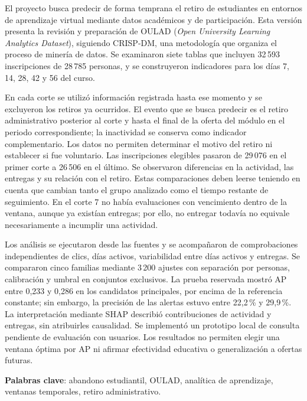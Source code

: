 El proyecto busca predecir de forma temprana el retiro de estudiantes en entornos de aprendizaje virtual mediante datos académicos y de participación. Esta versión presenta la revisión y preparación de OULAD (\textit{Open University Learning Analytics Dataset}), siguiendo CRISP-DM, una metodología que organiza el proceso de minería de datos. Se examinaron siete tablas que incluyen 32\,593 inscripciones de 28\,785 personas, y se construyeron indicadores para los días 7, 14, 28, 42 y 56 del curso.

En cada corte se utilizó información registrada hasta ese momento y se excluyeron los retiros ya ocurridos. El evento que se busca predecir es el retiro administrativo posterior al corte y hasta el final de la oferta del módulo en el periodo correspondiente; la inactividad se conserva como indicador complementario. Los datos no permiten determinar el motivo del retiro ni establecer si fue voluntario. Las inscripciones elegibles pasaron de 29\,076 en el primer corte a 26\,506 en el último. Se observaron diferencias en la actividad, las entregas y su relación con el retiro. Estas comparaciones deben leerse teniendo en cuenta que cambian tanto el grupo analizado como el tiempo restante de seguimiento. En el corte 7 no había evaluaciones con vencimiento dentro de la ventana, aunque ya existían entregas; por ello, no entregar todavía no equivale necesariamente a incumplir una actividad.

Los análisis se ejecutaron desde las fuentes y se acompañaron de comprobaciones independientes de clics, días activos, variabilidad entre días activos y entregas. Se compararon cinco familias mediante 3\,200 ajustes con separación por personas, calibración y umbral en conjuntos exclusivos. La prueba reservada mostró AP entre 0,233 y 0,286 en los candidatos principales, por encima de la referencia constante; sin embargo, la precisión de las alertas estuvo entre 22,2\,\% y 29,9\,\%. La interpretación mediante SHAP describió contribuciones de actividad y entregas, sin atribuirles causalidad. Se implementó un prototipo local de consulta pendiente de evaluación con usuarios. Los resultados no permiten elegir una ventana óptima por AP ni afirmar efectividad educativa o generalización a ofertas futuras.

\textbf{Palabras clave}: abandono estudiantil, OULAD, analítica de aprendizaje, ventanas temporales, retiro administrativo.
